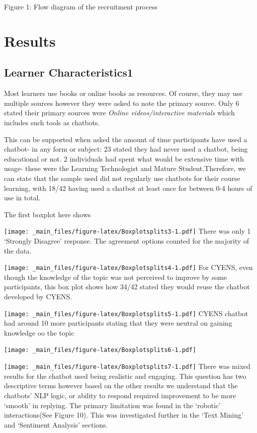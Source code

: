 \documentclass[a4paper, nobind]{templates/ociamthesis}
\begin{document}
Figure 1: Flow diagram of the recruitment process

\hypertarget{rmd-basics}{%
\chapter{Results}\label{rmd-basics}}

\minitoc 

\noindent

\hypertarget{learner-characteristics1}{%
\section{Learner Characteristics1}\label{learner-characteristics1}}

Most learners use books or online books as resources. Of course, they
may use multiple sources however they were asked to note the primary
source. Only 6 stated their primary sources were \emph{Online
videos/interactive materials} which includes such tools as chatbots.

This can be supported when asked the amount of time participants have
used a chatbot- in any form or subject: 23 stated they had never used a
chatbot, being educational or not. 2 individuals had spent what would be
extensive time with usage- these were the Learning Technologist and
Mature Student.Therefore, we can state that the sample used did not regularly use chatbots for their course learning, with 18/42 having used a chatbot at least once for between 0-4 hours of use in total.

The first boxplot here shows

\texttt{[image: \_main\_files/figure-latex/Boxplotsplits3-1.pdf]}
There was only 1 `Strongly Disagree' response.
The agreement options counted for the majority of the data.

\texttt{[image: \_main\_files/figure-latex/Boxplotsplits4-1.pdf]}
For CYENS, even though the knowledge of the topic was not perceived to improve by some participants, this box plot shows how 34/42 stated they would reuse the chatbot developed by CYENS.

\texttt{[image: \_main\_files/figure-latex/Boxplotsplits5-1.pdf]}
CYENS chatbot had around 10 more participants stating that they were neutral on gaining knowledge oo the topic

\texttt{[image: \_main\_files/figure-latex/Boxplotsplits6-1.pdf]}

\texttt{[image: \_main\_files/figure-latex/Boxplotsplits7-1.pdf]}
There was mixed results for the chatbot used being realistic and engaging. This question has two descriptive terms however based on the other results we understand that the chatbots' NLP logic, or ability to respond required improvement to be more `smooth' in replying. The primary limitation was found in the `robotic' interactions(See Figure 10). This was investigated further in the `Text Mining' and `Sentiment Analysis' sections.
\end{document}
